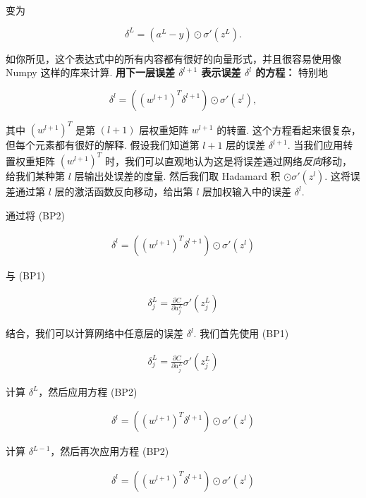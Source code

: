 \noindent 变为

\begin{equation}
\delta^L = (a^L-y) \odot \sigma'(z^L).
\tag{30}
\end{equation}

\noindent 如你所见，这个表达式中的所有内容都有很好的向量形式，并且很容易使用像 Numpy 这样的库来计算. \textbf{用下一层误差 $\delta^{l+1}$ 表示误差 $\delta^l$ 的方程：} 特别地

\begin{equation}
\delta^l = ((w^{l+1})^T \delta^{l+1}) \odot \sigma'(z^l),
\tag{BP2}
\end{equation}

\noindent 其中 $(w^{l+1})^T$ 是第 $(l+1)$ 层权重矩阵 $w^{l+1}$ 的转置. 这个方程看起来很复杂，但每个元素都有很好的解释. 假设我们知道第 $l+1$ 层的误差 $\delta^{l+1}$. 当我们应用转置权重矩阵 $(w^{l+1})^T$ 时，我们可以直观地认为这是将误差通过网络\emph{反向}移动，给我们某种第 $l$ 层输出处误差的度量. 然后我们取 Hadamard 积 $\odot \sigma'(z^l)$. 这将误差通过第 $l$ 层的激活函数反向移动，给出第 $l$ 层加权输入中的误差 $\delta^l$.

通过将 (BP2)

\begin{align*}
\delta^l = ((w^{l+1})^T \delta^{l+1}) \odot \sigma'(z^l) \nonumber
\end{align*}

\noindent 与 (BP1)

\begin{align*}
\delta^L_j = \frac{\partial C}{\partial a^L_j} \sigma'(z^L_j) \nonumber
\end{align*}

\noindent 结合，我们可以计算网络中任意层的误差 $\delta^l$. 我们首先使用 (BP1)

\begin{align*}
\delta^L_j = \frac{\partial C}{\partial a^L_j} \sigma'(z^L_j) \nonumber
\end{align*}

\noindent 计算 $\delta^L$，然后应用方程 (BP2)

\begin{align*}
\delta^l = ((w^{l+1})^T \delta^{l+1}) \odot \sigma'(z^l) \nonumber
\end{align*}

\noindent 计算 $\delta^{L-1}$，然后再次应用方程 (BP2)

\begin{align*}
\delta^l = ((w^{l+1})^T \delta^{l+1}) \odot \sigma'(z^l) \nonumber
\end{align*}

